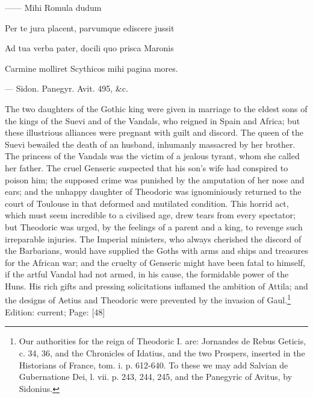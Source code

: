 {\texthebrew{——} Mihi Romula dudum

Per te jura placent, parvumque ediscere jussit

Ad tua verba pater, docili quo prisca Maronis

Carmine molliret Scythicos mihi pagina mores.

\texthebrew{—} Sidon. Panegyr. Avit. 495, \&c.} The two daughters of the Gothic king were given in marriage to the eldest sons of the kings of the Suevi and of the Vandals, who reigned in Spain and Africa; but these illustrious alliances were pregnant with guilt and discord. The queen of the Suevi bewailed the death of an husband, inhumanly massacred by her brother. The princess of the Vandals was the victim of a jealous tyrant, whom she called her father. The cruel Genseric suspected that his son\texthebrew{}’s wife had conspired to poison him; the supposed crime was punished by the amputation of her nose and ears; and the unhappy daughter of Theodoric was ignominiously returned to the court of Toulouse in that deformed and mutilated condition. This horrid act, which must seem incredible to a civilised age, drew tears from every spectator; but Theodoric was urged, by the feelings of a parent and a king, to revenge such irreparable injuries. The Imperial ministers, who always cherished the discord of the Barbarians, would have supplied the Goths with arms and ships and treasures for the African war; and the cruelty of Genseric might have been fatal to himself, if the artful Vandal had not armed, in his cause, the formidable power of the Huns. His rich gifts and pressing solicitations inflamed the ambition of Attila; and the designs of Aetius and Theodoric were prevented by the invasion of Gaul.\footnote{Our authorities for the reign of Theodoric I. are: Jornandes de Rebus Geticis, c. 34, 36, and the Chronicles of Idatius, and the two Prospers, inserted in the Historians of France, tom. i. p. 612-640. To these we may add Salvian de Gubernatione Dei, l. vii. p. 243, 244, 245, and the Panegyric of Avitus, by Sidonius.}
Edition: current; Page: [48]


